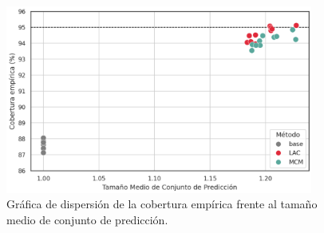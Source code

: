 \begin{figure}[htbp]
    \centering
    \includegraphics[width=0.9\textwidth]{capitulos/cap_05/imagenes/AMM_scatterplot_EC-MPSS.png}
    \caption[
        Problema de estimación de mayoría de edad: 
        Gráfica de dispersión de la cobertura empírica frente al tamaño medio de conjunto de predicción.
    ]{
        Gráfica de dispersión de la cobertura empírica frente al tamaño medio de conjunto de predicción.
    }
    \label{fig:AMM_scatterplot_EC-MPSS}
\end{figure}

\FloatBarrier

